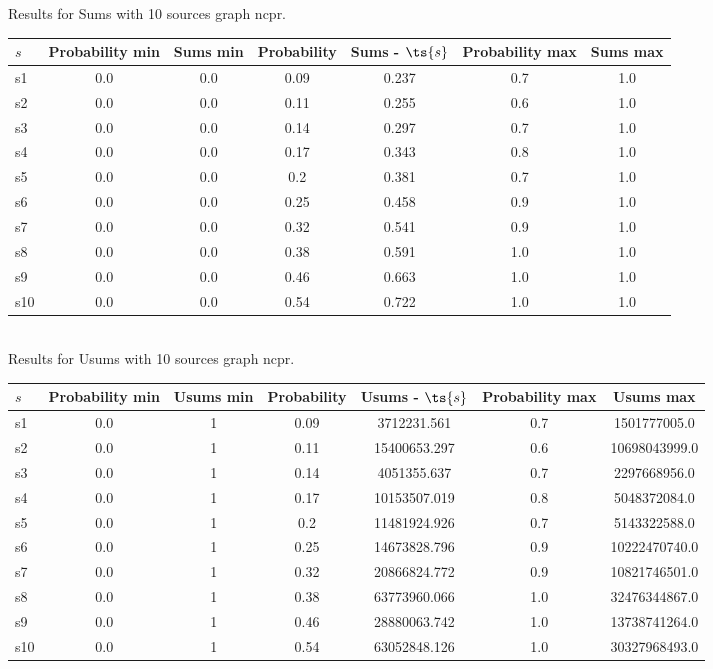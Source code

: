 \documentclass{article}
\begin{document}
\noindent Results for Sums with 10 sources graph ncpr.

\noindent\begin{tabular}{|l|c|c|c|c|c|c|}
\hline
$s$& Probability min & Sums min & Probability & Sums - $\ts{s}$ & Probability max & Sums max\\
\hline
s1 &0.0 & 0.0 & 0.09 & 0.237 & 0.7 & 1.0\\
\hline
s2 &0.0 & 0.0 & 0.11 & 0.255 & 0.6 & 1.0\\
\hline
s3 &0.0 & 0.0 & 0.14 & 0.297 & 0.7 & 1.0\\
\hline
s4 &0.0 & 0.0 & 0.17 & 0.343 & 0.8 & 1.0\\
\hline
s5 &0.0 & 0.0 & 0.2 & 0.381 & 0.7 & 1.0\\
\hline
s6 &0.0 & 0.0 & 0.25 & 0.458 & 0.9 & 1.0\\
\hline
s7 &0.0 & 0.0 & 0.32 & 0.541 & 0.9 & 1.0\\
\hline
s8 &0.0 & 0.0 & 0.38 & 0.591 & 1.0 & 1.0\\
\hline
s9 &0.0 & 0.0 & 0.46 & 0.663 & 1.0 & 1.0\\
\hline
s10 &0.0 & 0.0 & 0.54 & 0.722 & 1.0 & 1.0\\
\hline
\end{tabular}\\

\noindent Results for Usums with 10 sources graph ncpr.

\noindent\begin{tabular}{|l|c|c|c|c|c|c|}
\hline
$s$& Probability min & Usums min & Probability & Usums - $\ts{s}$ & Probability max & Usums max\\
\hline
s1 &0.0 & 1 & 0.09 & 3712231.561 & 0.7 & 1501777005.0\\
\hline
s2 &0.0 & 1 & 0.11 & 15400653.297 & 0.6 & 10698043999.0\\
\hline
s3 &0.0 & 1 & 0.14 & 4051355.637 & 0.7 & 2297668956.0\\
\hline
s4 &0.0 & 1 & 0.17 & 10153507.019 & 0.8 & 5048372084.0\\
\hline
s5 &0.0 & 1 & 0.2 & 11481924.926 & 0.7 & 5143322588.0\\
\hline
s6 &0.0 & 1 & 0.25 & 14673828.796 & 0.9 & 10222470740.0\\
\hline
s7 &0.0 & 1 & 0.32 & 20866824.772 & 0.9 & 10821746501.0\\
\hline
s8 &0.0 & 1 & 0.38 & 63773960.066 & 1.0 & 32476344867.0\\
\hline
s9 &0.0 & 1 & 0.46 & 28880063.742 & 1.0 & 13738741264.0\\
\hline
s10 &0.0 & 1 & 0.54 & 63052848.126 & 1.0 & 30327968493.0\\
\hline
\end{tabular}\\
\end{document}
